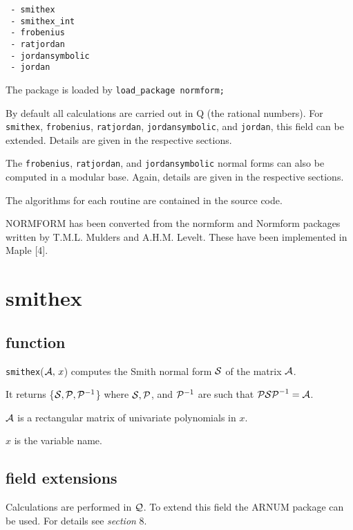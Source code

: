 \begin{itemize}
\begin{verbatim}
 - smithex
 - smithex_int
 - frobenius
 - ratjordan
 - jordansymbolic
 - jordan
\end{verbatim}
\end{itemize}
 
The package is loaded by {\tt load\_package normform;}

By default all calculations are carried out in {\cal Q} (the rational 
numbers). For {\tt smithex}, {\tt frobenius}, {\tt ratjordan}, 
{\tt jordansymbolic}, and {\tt jordan}, this field can be extended. 
Details are given in the respective sections.

The {\tt frobenius}, {\tt ratjordan}, and {\tt jordansymbolic} normal 
forms can also be computed in a modular base. Again, details are given 
in the respective sections.

The algorithms for each routine are contained in the source code.

{\small NORMFORM} has been converted from the normform and Normform 
packages written by T.M.L. Mulders and A.H.M. Levelt. These have been 
implemented in Maple [4].


\section{smithex}

\subsection{function}

{\tt smithex}(${\cal A},\, x$) computes the Smith normal form ${\cal S}$
of the matrix ${\cal A}$.

It returns \{${\cal S}, {\cal P}, {\cal P}^{-1}$\} where ${\cal S}, 
{\cal P}$, and ${\cal P}^{-1}$ are such that ${\cal P S P}^{-1} = 
{\cal A}$.

${\cal A}$ is a rectangular matrix of univariate polynomials in $x$.

$x$ is the variable name.

\subsection{field extensions}

Calculations are performed in ${\cal Q}$. To extend this field the 
{\small ARNUM} package can be used. For details see {\it section} 8.

